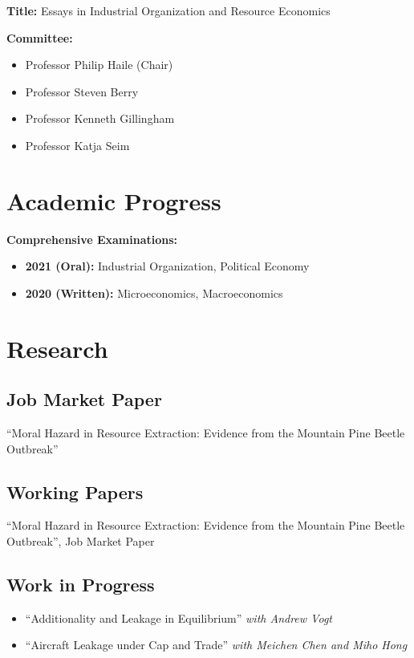 \documentclass[11pt,letterpaper]{article}
\begin{document}
\textbf{Title:} Essays in Industrial Organization and Resource Economics

\textbf{Committee:}
\begin{itemize}
\item Professor Philip Haile (Chair)
\item Professor Steven Berry  
\item Professor Kenneth Gillingham
\item Professor Katja Seim
\end{itemize}

\section*{Academic Progress}

\textbf{Comprehensive Examinations:}
\begin{itemize}
\item \textbf{2021 (Oral):} Industrial Organization, Political Economy
\item \textbf{2020 (Written):} Microeconomics, Macroeconomics  
\end{itemize}

\section*{Research}

\subsection*{Job Market Paper}
``Moral Hazard in Resource Extraction: Evidence from the Mountain Pine Beetle Outbreak''

\subsection*{Working Papers}
``Moral Hazard in Resource Extraction: Evidence from the Mountain Pine Beetle Outbreak'', Job Market Paper

\subsection*{Work in Progress}
\begin{itemize}
\item ``Additionality and Leakage in Equilibrium'' \textit{with Andrew Vogt}
\item ``Aircraft Leakage under Cap and Trade'' \textit{with Meichen Chen and Miho Hong}
\end{itemize}
\end{document}
